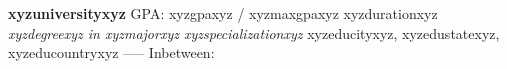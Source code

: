 \item \textbf{xyzuniversityxyz} GPA: xyzgpaxyz / xyzmaxgpaxyz  \hfill xyzdurationxyz \\
\textit{xyzdegreexyz in xyzmajorxyz xyzspecializationxyz} \hfill xyzeducityxyz, xyzedustatexyz, xyzeducountryxyz
-----
Inbetween: \vspace{5pt}
